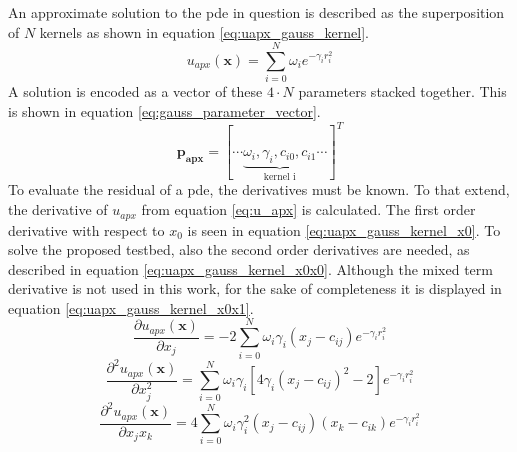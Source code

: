 \documentclass[./\jobname.tex]{subfiles}
\begin{document}
An approximate solution to the \gls{pde} in question is described as the superposition of $N$ kernels as shown in equation \eqref{eq:uapx_gauss_kernel}. 
\begin{equation}
\label{eq:uapx_gauss_kernel}
u_{apx}(\mathbf{x}) = \sum_{i=0}^{N} \omega_i e^{-\gamma_i r_i^2}
\end{equation}
A solution is encoded as a vector of these $4\cdot N$ parameters stacked together. This is shown in equation \eqref{eq:gauss_parameter_vector}. 
\begin{equation}
\label{eq:gauss_parameter_vector}
\mathbf{p_{apx}} = \left[\cdots \underbrace{\omega_i, \gamma_i, c_{i0}, c_{i1}}_{\text{kernel i}}\cdots \right]^T
\end{equation}
To evaluate the residual of a \gls{pde}, the derivatives must be known. To that extend, the derivative of $u_{apx}$ from equation \eqref{eq:u_apx} is calculated. The first order derivative with respect to $x_0$ is seen in equation \eqref{eq:uapx_gauss_kernel_x0}. To solve the proposed testbed, also the second order derivatives are needed, as described in equation \eqref{eq:uapx_gauss_kernel_x0x0}. Although the mixed term derivative is not used in this work, for the sake of completeness it is displayed in equation \eqref{eq:uapx_gauss_kernel_x0x1}.  
\begin{equation}
\label{eq:uapx_gauss_kernel_x0}
\frac{\partial u_{apx}(\mathbf{x})}{\partial x_j} = -2 \sum_{i=0}^{N} \omega_i \gamma_i (x_j - c_{ij}) e^{-\gamma_i r_i^2}
\end{equation}
\begin{equation}
\label{eq:uapx_gauss_kernel_x0x0}
\frac{\partial^2 u_{apx}(\mathbf{x})}{\partial x_j^2} = \sum_{i=0}^{N} \omega_i \gamma_i \left[ 4 \gamma_i (x_j - c_{ij})^2 - 2 \right] e^{-\gamma_i r_i^2}
\end{equation}
\begin{equation}
\label{eq:uapx_gauss_kernel_x0x1}
\frac{\partial^2 u_{apx}(\mathbf{x})}{\partial x_j x_k} = 4 \sum_{i=0}^{N} \omega_i \gamma_i^2 (x_j - c_{ij}) (x_k - c_{ik}) e^{-\gamma_i r_i^2} 
\end{equation}
\end{document}
